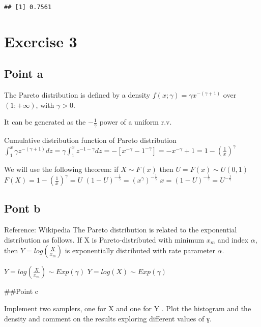 \documentclass[
]{article}
\begin{document}
\begin{verbatim}
## [1] 0.7561
\end{verbatim}

\hypertarget{exercise-3}{%
\section{Exercise 3}\label{exercise-3}}

\hypertarget{point-a-1}{%
\subsection{Point a}\label{point-a-1}}

The Pareto distribution is defined by a density
\(f(x;\gamma)=\gamma x^{-(\gamma +1)}\) over \((1;+\infty)\), with
\(\gamma >0\).

It can be generated as the \(-\frac{1}{\gamma}\) power of a uniform r.v.

Cumulative distribution function of Pareto distribution
\(\int_1^x \gamma z^{-(\gamma +1)} dz= \gamma \int_1^x z^{-1-\gamma}dz=-[x^{-\gamma}-1^{-\gamma}]=-x^{-\gamma}+1=1-(\frac{1}{x})^{\gamma}\)

We will use the following theorem: if \(X \sim F(x)\) then
\(U=F(x) \sim U(0,1)\) \(F(X)=1-(\frac{1}{x})^{\gamma}=U\)
\((1-U)^{-\frac{1}{\gamma}}=(x^{\gamma})^{-\frac{1}{\gamma}}\)
\(x=(1-U)^{-\frac{1}{\gamma}}=U^{-\frac{1}{\gamma}}\)

\hypertarget{pont-b}{%
\subsection{Pont b}\label{pont-b}}

Reference: Wikipedia The Pareto distribution is related to the
exponential distribution as follows. If X is Pareto-distributed with
minimum \(x_m\) and index \(\alpha\), then \(Y=log(\frac{X}{x_m})\) is
exponentially distributed with rate parameter \(\alpha\).

\(Y=log(\frac{X}{x_m}) \sim Exp(\gamma)\) \(Y=log(X) \sim Exp(\gamma)\)

\#\#Point c

Implement two samplers, one for X and one for Y . Plot the histogram and
the density and comment on the results exploring different values of γ.
\end{document}
